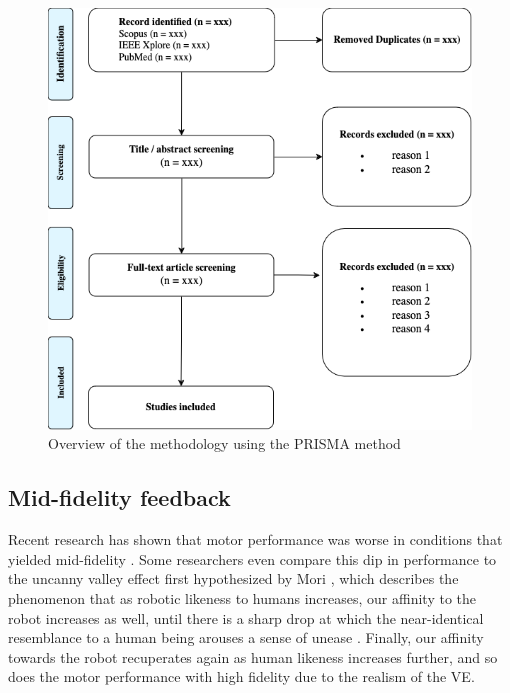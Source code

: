 \documentclass[conference]{IEEEtran}
\begin{document}
\begin{figure}[ht]
    \centering
    \includegraphics[width=\columnwidth]{prisma_drawio.png} %
    \caption{Overview of the methodology using the PRISMA method}
    \label{fig:my_label}
\end{figure}


\subsection{Mid-fidelity feedback}
Recent research has shown that motor performance was worse in conditions that yielded mid-fidelity \cite{MahdiNabiyouni201520153DUI.}.
Some researchers even compare this dip in performance to the uncanny valley effect first hypothesized by Mori \cite{Mori2012TheValley}, which describes the phenomenon that as robotic likeness to humans increases, our affinity to the robot increases as well, until there is a sharp drop at which the near-identical resemblance to a human being arouses a sense of unease \cite{Bhargava2018EvaluatingSimulations}. Finally, our affinity towards the robot recuperates again as human likeness increases further, and so does the motor performance with high fidelity due to the realism of the VE. 
\end{document}
